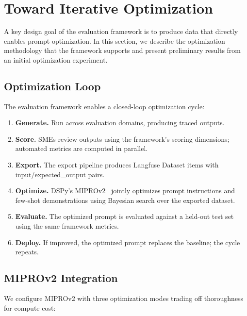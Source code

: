 \section{Toward Iterative Optimization}
\label{sec:optimization}

A key design goal of the evaluation framework is to produce data that directly enables prompt optimization. In this section, we describe the optimization methodology that the framework supports and present preliminary results from an initial optimization experiment.

\subsection{Optimization Loop}

The evaluation framework enables a closed-loop optimization cycle:

\begin{enumerate}
    \item \textbf{Generate.} Run \threatforest{} across evaluation domains, producing traced outputs.
    \item \textbf{Score.} SMEs review outputs using the framework's scoring dimensions; automated metrics are computed in parallel.
    \item \textbf{Export.} The export pipeline produces Langfuse Dataset items with input/expected\_output pairs.
    \item \textbf{Optimize.} DSPy's MIPROv2~\cite{opsahlong2024miprov2} jointly optimizes prompt instructions and few-shot demonstrations using Bayesian search over the exported dataset.
    \item \textbf{Evaluate.} The optimized prompt is evaluated against a held-out test set using the same framework metrics.
    \item \textbf{Deploy.} If improved, the optimized prompt replaces the baseline; the cycle repeats.
\end{enumerate}

\subsection{MIPROv2 Integration}

We configure MIPROv2 with three optimization modes trading off thoroughness for compute cost:

